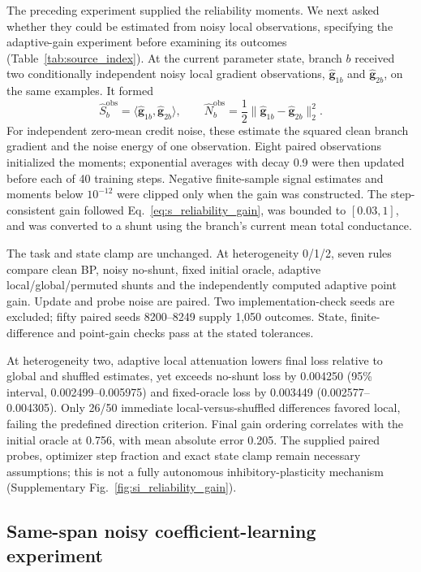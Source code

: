 The preceding experiment supplied the reliability moments. We next asked
whether they could be estimated from noisy local observations, specifying
the adaptive-gain experiment before examining its outcomes
(Table~\ref{tab:source_index}). At the current parameter
state, branch $b$ received two conditionally independent noisy local gradient
observations, $\widehat{\bm g}_{1b}$ and $\widehat{\bm g}_{2b}$, on the same
examples. It formed
\begin{equation}
 \widehat S_b^{\mathrm{obs}}
 =\langle\widehat{\bm g}_{1b},\widehat{\bm g}_{2b}\rangle,
 \qquad
 \widehat N_b^{\mathrm{obs}}
 =\frac12\lVert\widehat{\bm g}_{1b}-\widehat{\bm g}_{2b}\rVert_2^2.
\label{eq:s_adaptive_reliability_moments}
\end{equation}
For independent zero-mean credit noise, these estimate the squared clean
branch gradient and the noise energy of one observation. Eight paired
observations initialized the moments; exponential averages with decay 0.9
were then updated before each of 40 training steps. Negative finite-sample
signal estimates and moments below $10^{-12}$ were clipped only when the gain
was constructed. The step-consistent gain followed
Eq.~\ref{eq:s_reliability_gain}, was bounded to $[0.03,1]$, and was converted
to a shunt using the branch's current mean total conductance.

The task and state clamp are unchanged. At heterogeneity 0/1/2, seven rules compare clean BP, noisy no-shunt, fixed initial oracle, adaptive local/global/permuted shunts and the independently computed adaptive point gain. Update and probe noise are paired. Two implementation-check seeds are excluded; fifty paired seeds 8200--8249 supply 1,050 outcomes. State, finite-difference and point-gain checks pass at the stated tolerances.

At heterogeneity two, adaptive local attenuation lowers final loss relative to global and shuffled estimates, yet exceeds no-shunt loss by 0.004250 (95\% interval, 0.002499--0.005975) and fixed-oracle loss by 0.003449 (0.002577--0.004305). Only 26/50 immediate local-versus-shuffled differences favored local, failing the predefined direction criterion. Final gain ordering correlates with the initial oracle at 0.756, with mean absolute error 0.205. The supplied paired probes, optimizer step fraction and exact state clamp remain necessary assumptions; this is not a fully autonomous inhibitory-plasticity mechanism (Supplementary Fig.~\ref{fig:si_reliability_gain}).

\subsection{Same-span noisy coefficient-learning experiment}

